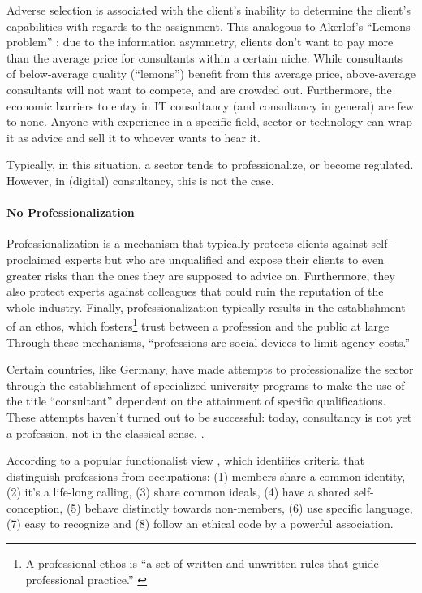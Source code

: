\documentclass[12pt]{article}
\begin{document}
Adverse selection is associated with the client's inability to determine
the client's capabilities with regards to the assignment. This analogous
to Akerlof's ``Lemons problem'' \citeyearpar{akerlof1970}: due to the
information asymmetry, clients don't want to pay more than the average
price for consultants within a certain niche. While consultants of
below-average quality (``lemons'') benefit from this average price,
above-average consultants will not want to compete, and are crowded out.
Furthermore, the economic barriers to entry \citep[ 463]{fee2004} in IT
consultancy (and consultancy in general) are few to none. Anyone with
experience in a specific field, sector or technology can wrap it as
advice and sell it to whoever wants to hear it.

Typically, in this situation, a sector tends to professionalize, or
become regulated. However, in (digital) consultancy, this is not the
case.

\paragraph{No Professionalization}\label{no-professionalization}

Professionalization is a mechanism that typically protects clients
against self-proclaimed experts but who are unqualified and expose their
clients to even greater risks than the ones they are supposed to advice
on. \citep[ 71]{kieser2006} Furthermore, they also protect experts
against colleagues that could ruin the reputation of the whole industry.
Finally, professionalization typically results in the establishment of
an ethos, which fosters\footnote{A professional ethos is ``a set of
  written and unwritten rules that guide professional practice.''
  \citep{enstad2017}} trust between a profession and the public at large
\citep{sokolowski1991} Through these mechanisms, ``professions are
social devices to limit agency costs.'' \citep[ 276]{shapiro2005}

Certain countries, like Germany, have made attempts to professionalize
the sector through the establishment of specialized university programs
to make the use of the title ``consultant'' dependent on the attainment
of specific qualifications. These attempts haven't turned out to be
successful: today, consultancy is not yet a profession, not in the
classical sense. \citep[ 73]{kieser2006}.

According to a popular functionalist view \citep{goode1957}, which
identifies criteria that distinguish professions from occupations: (1)
members share a common identity, (2) it's a life-long calling, (3) share
common ideals, (4) have a shared self-conception, (5) behave distinctly
towards non-members, (6) use specific language, (7) easy to recognize
and (8) follow an ethical code by a powerful association.
\end{document}
